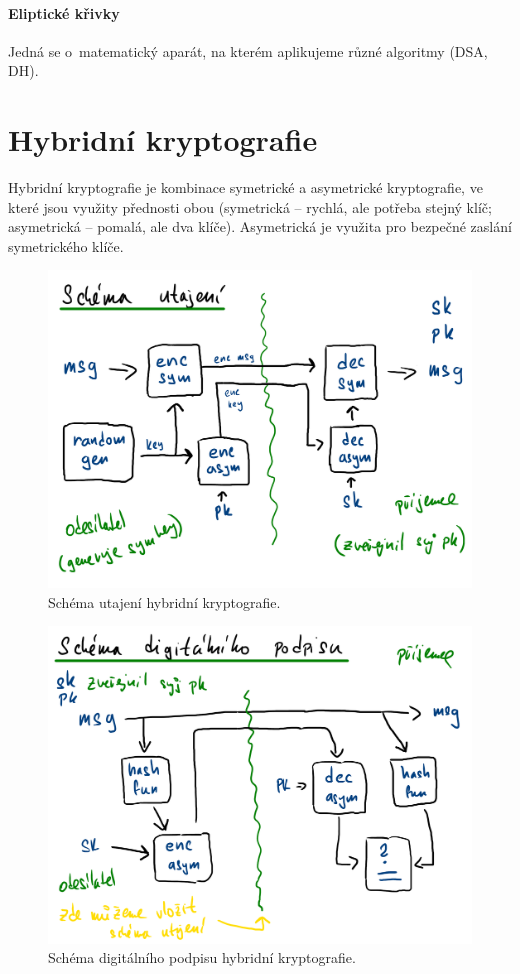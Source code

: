 \paragraph*{Eliptické křivky} Jedná se o~matematický aparát, na kterém aplikujeme různé algoritmy (DSA, DH).


\section{Hybridní kryptografie}

Hybridní kryptografie je kombinace symetrické a asymetrické kryptografie, ve které jsou využity přednosti obou (symetrická -- rychlá, ale potřeba stejný klíč; asymetrická -- pomalá, ale dva klíče). Asymetrická je využita pro bezpečné zaslání symetrického klíče.

\begin{figure}[H]
    \centering
    \includegraphics[width=1\linewidth]{hybrid_utajeni.pdf}
    \caption{Schéma utajení hybridní kryptografie.}
\end{figure}

\begin{figure}[H]
    \centering
    \includegraphics[width=1\linewidth]{hybrid_podpis.pdf}
    \caption{Schéma digitálního podpisu hybridní kryptografie.}
\end{figure}

